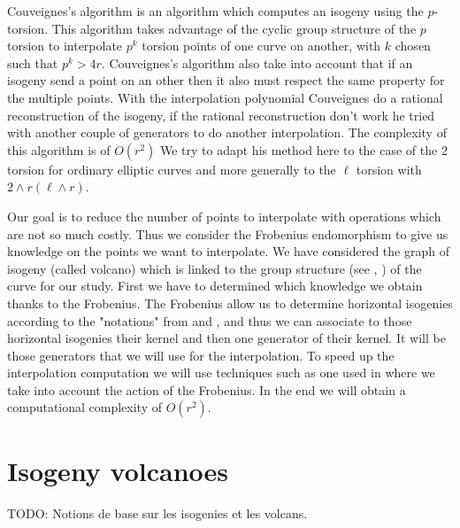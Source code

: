 \documentclass{article}
\newcommand{\todo}[1]{{\color{red}TODO: #1}}
\theoremstyle{plain}
\theoremstyle{definition}
\theoremstyle{remark}
\begin{document}

Couveignes's algorithm \cite{couveignes96} is an algorithm which computes an isogeny using the $p$-torsion. This algorithm takes advantage of the cyclic group structure of the $p$ torsion to interpolate $p^k$ torsion points of one curve on another, with $k$ chosen such that $p^k>4r$. Couveignes's algorithm also take into account that if an isogeny send a point on an other then it also must respect the same property for the multiple points. With the interpolation polynomial Couveignes do a rational reconstruction of the isogeny, if the rational reconstruction don't work he tried with another couple of generators to do another interpolation. The complexity of this algorithm is of $O(r^2)$
\newline
We try to adapt his method here to the case of the $2$ torsion for ordinary elliptic curves and more generally to the $\ell$ torsion with $2 \wedge r ( \ell \wedge r)$.

Our goal is to reduce the number of points to interpolate with operations which are not so much costly. Thus we consider the Frobenius endomorphism to give us knowledge on the points we want to interpolate. We have considered the graph of isogeny (called volcano) which is linked to the group structure (see \cite{MiretMRV05}, \cite{IonicaJ10} ) of the curve for our study. First we have to determined which knowledge we obtain thanks to the Frobenius. The Frobenius allow us to determine horizontal isogenies according to the "notations" from \cite{Kohel} and \cite{volcano}, and thus we can associate to those horizontal isogenies their kernel and then one generator of their kernel. It will be those generators that we will use for the interpolation. To speed up the interpolation computation we will use techniques such as one used in \cite{enge+morain03} where we take into account the action of the Frobenius. In the end we will obtain a computational complexity of $O(r^2)$.


\section{Isogeny volcanoes}
\label{sec:isogeny-volcanoes}

\todo{Notions de base sur les isogenies et les volcans.}
\end{document}
